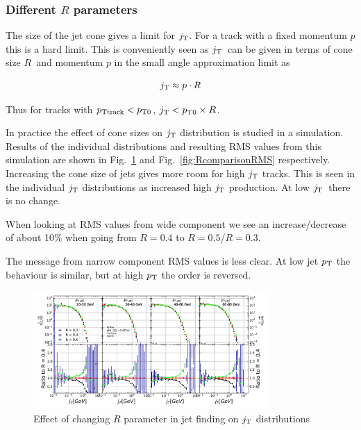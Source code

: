 \subsubsection{Different $R$ parameters}
\label{sec:Rstudy}
The size of the jet cone gives a limit for $\jt{}$. For a track with a fixed momentum $p$ this is a hard limit. This is conveniently seen as $\jt{}$ can be given in terms of cone size $R$ and momentum $p$ in the small angle approximation limit as

\begin{equation}
j_{\rm T} \approx p \cdot R
\end{equation}

Thus for tracks with $p_{\rm Ttrack} < p_{\rm T0} $, $j_{\rm T} < p_{\rm T0} \times R$.
 

In practice the effect of cone sizes on $\jt{}$ distribution is studied in a \pythia simulation. Results of the individual distributions and resulting RMS values from this simulation are shown in Fig.~\ref{fig:RcomparisonjT} and Fig.~\ref{fig:RcomparisonRMS} respectively. Increasing the cone size of jets gives more room for high $\jt{}$ tracks. This is seen in the individual $\jt{}$ distributions as increased high $\jt{}$ production. At low $\jt{}$ there is no change.

When looking at RMS values from wide component we see an increase/decrease of about 10\% when going from $R=0.4$ to $R=0.5$/$R=0.3$.

The message from narrow component RMS values is less clear. At low jet $p_{\rm T}$ the behaviour is similar, but at high $p_{\rm T}$ the order is reversed.
\begin{figure}[htp]
\centering
\includegraphics[width=0.8\textwidth]{results/RcomparisonSignal.pdf}
\caption[Pythia $R$ parameters $\jt{}$]{Effect of changing $R$ parameter in jet finding on $\jt{}$ distributions}
\label{fig:RcomparisonjT}
\end{figure}


